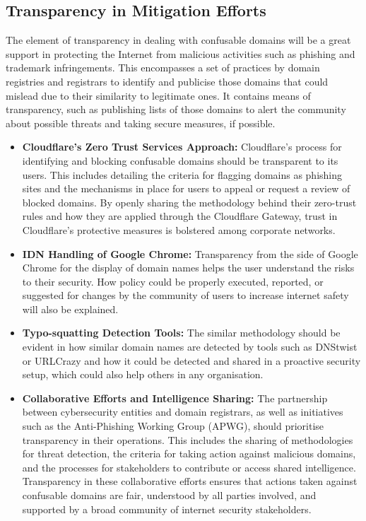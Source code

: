 \subsection{ Transparency in Mitigation Efforts}

The element of transparency in dealing with confusable domains will be a great support in protecting the Internet from malicious activities such as phishing and trademark infringements. This encompasses a set of practices by domain registries and registrars to identify and publicise those domains that could mislead due to their similarity to legitimate ones. It contains means of transparency, such as publishing lists of those domains to alert the community about possible threats and taking secure measures, if possible.

\begin{itemize}
  \item \textbf{Cloudflare's Zero Trust Services Approach: }Cloudflare's process for identifying and blocking confusable domains should be transparent to its users. This includes detailing the criteria for flagging domains as phishing sites and the mechanisms in place for users to appeal or request a review of blocked domains. By openly sharing the methodology behind their zero-trust rules and how they are applied through the Cloudflare Gateway, trust in Cloudflare's protective measures is bolstered among corporate networks.
  
  
  \item \textbf{IDN Handling of Google Chrome:} Transparency from the side of Google Chrome for the display of domain names helps the user understand the risks to their security. How policy could be properly executed, reported, or suggested for changes by the community of users to increase internet safety will also be explained.

  \item \textbf{Typo-squatting Detection Tools: }The similar methodology should be evident in how similar domain names are detected by tools such as DNStwist or URLCrazy and how it could be detected and shared in a proactive security setup, which could also help others in any organisation.
  
  \item \textbf{Collaborative Efforts and Intelligence Sharing: }The partnership between cybersecurity entities and domain registrars, as well as initiatives such as the Anti-Phishing Working Group (APWG), should prioritise transparency in their operations. This includes the sharing of methodologies for threat detection, the criteria for taking action against malicious domains, and the processes for stakeholders to contribute or access shared intelligence. Transparency in these collaborative efforts ensures that actions taken against confusable domains are fair, understood by all parties involved, and supported by a broad community of internet security stakeholders.
  

\end{itemize}

